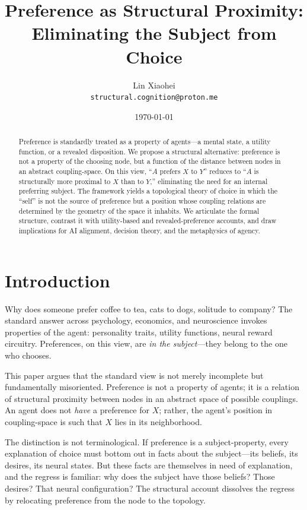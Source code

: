 \documentclass[12pt,a4paper]{article}
\title{Preference as Structural Proximity:\\
Eliminating the Subject from Choice}
\author{Lin‌ Xiaohei\\
\texttt{structural.cognition@proton.me}}
\date{\today}
\begin{document}
\maketitle

\begin{abstract}
Preference is standardly treated as a property of agents---a mental state, a utility function, or a revealed disposition. We propose a structural alternative: preference is not a property of the choosing node, but a function of the distance between nodes in an abstract coupling-space. On this view, ``$A$ prefers $X$ to $Y$'' reduces to ``$A$ is structurally more proximal to $X$ than to $Y$,'' eliminating the need for an internal preferring subject. The framework yields a topological theory of choice in which the ``self'' is not the source of preference but a position whose coupling relations are determined by the geometry of the space it inhabits. We articulate the formal structure, contrast it with utility-based and revealed-preference accounts, and draw implications for AI alignment, decision theory, and the metaphysics of agency.
\end{abstract}%

\section{Introduction}

Why does someone prefer coffee to tea, cats to dogs, solitude to company? The standard answer across psychology, economics, and neuroscience invokes properties of the agent: personality traits, utility functions, neural reward circuitry. Preferences, on this view, are \emph{in the subject}---they belong to the one who chooses.

This paper argues that the standard view is not merely incomplete but fundamentally misoriented. Preference is not a property of agents; it is a relation of structural proximity between nodes in an abstract space of possible couplings. An agent does not \emph{have} a preference for $X$; rather, the agent's position in coupling-space is such that $X$ lies in its neighborhood.

The distinction is not terminological. If preference is a subject-property, every explanation of choice must bottom out in facts about the subject---its beliefs, its desires, its neural states. But these facts are themselves in need of explanation, and the regress is familiar: why does the subject have those beliefs? Those desires? That neural configuration? The structural account dissolves the regress by relocating preference from the node to the topology.
\end{document}
